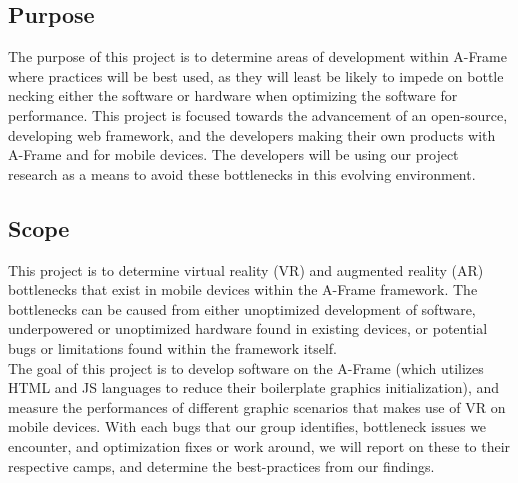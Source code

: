 \documentclass[letterpaper,10pt,titlepage,draftclsnofoot,onecolumn,compsoc,utf8,latin1]{IEEEtran}
\begin{document}
\subsection{Purpose}
\begin{singlespace}
\noindent
The purpose of this project is to determine areas of development within A-Frame where practices will be best used, as they will least be likely to impede on bottle necking either the software or hardware when optimizing the software for performance. This project is focused towards the advancement of an open-source, developing web framework, and the developers making their own products with A-Frame and for mobile devices. The developers will be using our project research as a means to avoid these bottlenecks in this evolving environment.
\end{singlespace}

\subsection{Scope}
\begin{singlespace}
\noindent
This project is to determine virtual reality (VR) and augmented reality (AR) bottlenecks that exist in mobile devices within the A-Frame framework. The bottlenecks can be caused from either unoptimized development of software, underpowered or unoptimized hardware found in existing devices, or potential bugs or limitations found within the framework itself.\\

\noindent
The goal of this project is to develop software on the A-Frame (which utilizes HTML and JS languages to reduce their boilerplate graphics initialization), and measure the performances of different graphic scenarios that makes use of VR on mobile devices. With each bugs that our group identifies, bottleneck issues we encounter, and optimization fixes or work around, we will report on these to their respective camps, and determine the best-practices from our findings. 
\end{singlespace}
\end{document}
